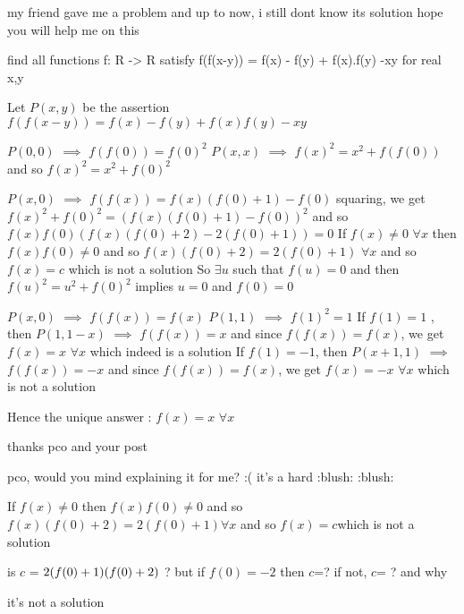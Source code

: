 \begin{solution}
	\begin{tcolorbox}my friend gave me a problem and up to now, i still dont know its solution 
hope you will help me on this
\begin{bolded}find all functions f: R -> R satisfy
f(f(x-y)) =  f(x) - f(y) + f(x).f(y) -xy 
for real x,y \end{bolded}\end{tcolorbox}
Let $P(x,y)$ be the assertion $f(f(x-y))=f(x)-f(y)+f(x)f(y)-xy$

$P(0,0)$ $\implies$ $f(f(0))=f(0)^2$
$P(x,x)$ $\implies$ $f(x)^2=x^2+f(f(0))$ and so $f(x)^2=x^2+f(0)^2$

$P(x,0)$ $\implies$ $f(f(x))=f(x)(f(0)+1)-f(0)$
squaring, we get $f(x)^2+f(0)^2=(f(x)(f(0)+1)-f(0))^2$ and so $f(x)f(0)(f(x)(f(0)+2)-2(f(0)+1))=0$
If $f(x)\ne 0$ $\forall x$ then $f(x)f(0)\ne 0$ and so $f(x)(f(0)+2)=2(f(0)+1)$ $\forall x$ and so $f(x)=c$ which is not a solution
So $\exists u$ such that $f(u)=0$ and then $f(u)^2=u^2+f(0)^2$ implies $u=0$ and $f(0)=0$

$P(x,0)$ $\implies$ $f(f(x))=f(x)$
$P(1,1)$ $\implies$ $f(1)^2=1$
If $f(1)=1$ , then $P(1,1-x)$ $\implies$ $f(f(x))=x$ and since $f(f(x))=f(x)$, we get $f(x)=x$ $\forall x$ which indeed is a solution
If $f(1)=-1$, then $P(x+1,1)$ $\implies$ $f(f(x))=-x$ and since $f(f(x))=f(x)$, we get $f(x)=-x$ $\forall x$ which is not a solution

Hence the unique answer : $\boxed{f(x)=x}$ $\forall x$
\end{solution}



\begin{solution}
	thanks pco and your post
\end{solution}



\begin{solution}
	pco, would you mind explaining it for me?  :(  it's a hard :blush:  :blush: 
\begin{tcolorbox}If $ f(x)\ne 0 $ then $f(x)f(0)\ne 0$ and so $ f(x)(f(0)+2)=2(f(0)+1) \forall x $ and so $f(x)=c $which is not a solution\end{tcolorbox}
is $c$ = $2(f(0)+1) \/ (f(0)+2) $ ? but if $ f(0)= -2$ then $c$=?
if not, $c$= ? and why \begin{bolded}it's  not  a  solution\end{bolded}
\end{solution}



